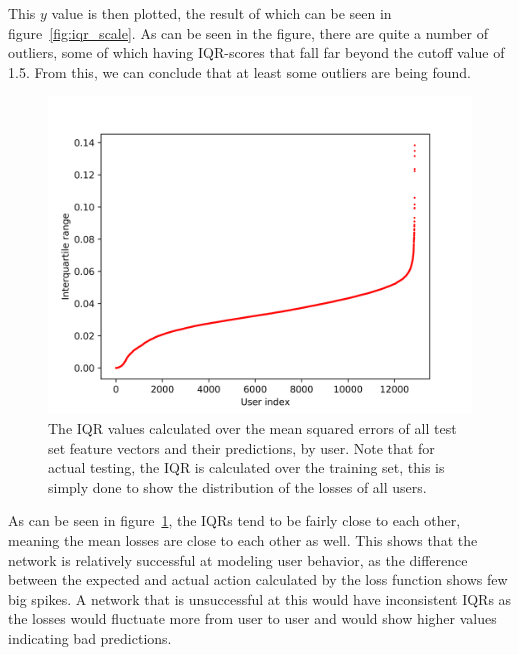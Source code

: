 This \(y\) value is then plotted, the result of which can be seen in figure~\ref{fig:iqr_scale}. As can be seen in the figure, there are quite a number of outliers, some of which having IQR-scores that fall far beyond the cutoff value of 1.5. From this, we can conclude that at least some outliers are being found. 

\begin{figure}
	\begin{center}
		\includegraphics[scale=1.6]{results/iqrs}
	\end{center}
	\caption{The IQR values calculated over the mean squared errors of all test set feature vectors and their predictions, by user. Note that for actual testing, the IQR is calculated over the training set, this is simply done to show the distribution of the losses of all users.~\label{fig:iqrs}}
\end{figure}

As can be seen in figure~\ref{fig:iqrs}, the IQRs tend to be fairly close to each other, meaning the mean losses are close to each other as well. This shows that the network is relatively successful at modeling user behavior, as the difference between the expected and actual action calculated by the loss function shows few big spikes. A network that is unsuccessful at this would have inconsistent IQRs as the losses would fluctuate more from user to user and would show higher values indicating bad predictions.

